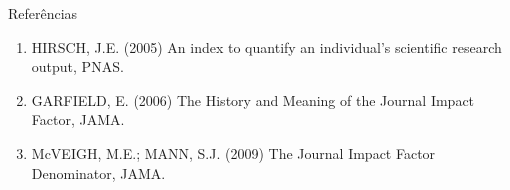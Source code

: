 \documentclass{beamer}
\begin{document}
\begin{frame}{Referências}
  \begin{enumerate}
  \item<1-> HIRSCH, J.E. (2005) An index to quantify an individual's scientific research output, PNAS.
  \item<1-> GARFIELD, E. (2006) The History and Meaning of the Journal Impact Factor, JAMA.
  \item<1-> McVEIGH, M.E.; MANN, S.J. (2009) The Journal Impact Factor Denominator, JAMA.
  \end{enumerate}
\end{frame}
\end{document}
